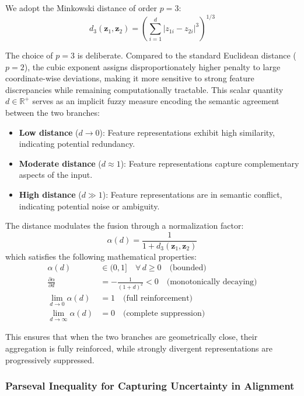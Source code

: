 \documentclass[preprint,12pt]{elsarticle}
\begin{document}
We adopt the Minkowski distance of order $p = 3$:
\begin{equation*}
    d_3(\mathbf{z}_1, \mathbf{z}_2) = \left( \sum_{i=1}^{d} |z_{1i} - z_{2i}|^3 \right)^{1/3}
\end{equation*}

The choice of $p=3$ is deliberate. Compared to the standard Euclidean distance ($p=2$), the cubic exponent assigns disproportionately higher penalty to large coordinate-wise deviations, making it more sensitive to strong feature discrepancies while remaining computationally tractable. This scalar quantity $d \in \mathbb{R}^+$ serves as an implicit fuzzy measure encoding the semantic agreement between the two branches:

\begin{itemize}
    \item \textbf{Low distance} ($d \rightarrow 0$): Feature representations exhibit high similarity, indicating potential redundancy.
    \item \textbf{Moderate distance} ($d \approx 1$): Feature representations capture complementary aspects of the input.
    \item \textbf{High distance} ($d \gg 1$): Feature representations are in semantic conflict, indicating potential noise or ambiguity.
\end{itemize}

The distance modulates the fusion through a normalization factor:
\begin{equation*}
    \alpha(d) = \frac{1}{1 + d_3(\mathbf{z}_1, \mathbf{z}_2)}
\end{equation*}
which satisfies the following mathematical properties: 
\begin{align*}
    \alpha(d) &\in (0, 1] \quad \forall \, d \geq 0 \quad \text{(bounded)} \\
    \frac{\partial \alpha}{\partial d} &= -\frac{1}{(1+d)^2} < 0 \quad \text{(monotonically decaying)} \\
    \lim_{d \to 0} \alpha(d) &= 1 \quad \text{(full reinforcement)} \\
    \lim_{d \to \infty} \alpha(d) &= 0 \quad \text{(complete suppression)}
\end{align*}

This ensures that when the two branches are geometrically close, their aggregation is fully reinforced, while strongly divergent representations are progressively suppressed.

\subsubsection{Parseval Inequality for Capturing Uncertainty in Alignment}
\end{document}
